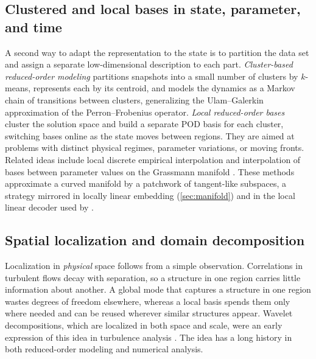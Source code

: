 \subsection{Clustered and local bases in state, parameter, and time}

A second way to adapt the representation to the state is to partition the data
set and assign a separate low-dimensional description to each part.
\emph{Cluster-based reduced-order modeling} \parencite{kaiser2014cluster}
partitions snapshots into a small number of clusters by $k$-means, represents
each by its centroid, and models the dynamics as a Markov chain of transitions
between clusters, generalizing the Ulam--Galerkin approximation of the
Perron--Frobenius operator. \emph{Local reduced-order bases}
\parencite{amsallem2012local} cluster the solution space and build a separate
POD basis for each cluster, switching bases online as the state moves between
regions. They are aimed at problems with distinct physical regimes, parameter
variations, or moving fronts. Related ideas include local discrete empirical
interpolation \parencite{peherstorfer2014ldeim} and interpolation of bases
between parameter values on the Grassmann manifold
\parencite{amsallem2008grassmann}. These methods approximate a curved manifold
by a patchwork of tangent-like subspaces, a strategy mirrored in locally linear
embedding (\cref{sec:manifold}) and in the local linear decoder used by
\textcite{loiseau2018sparse}.

\subsection{Spatial localization and domain decomposition}

Localization in \emph{physical} space follows from a simple observation.
Correlations in turbulent flows decay with separation, so a structure in one
region carries little information about another. A global mode that captures a
structure in one region wastes degrees of freedom elsewhere, whereas a local
basis spends them only where needed and can be reused wherever similar
structures appear. Wavelet decompositions, which are localized in both
space and scale, were an early expression of this idea in turbulence analysis
\parencite{farge1992wavelet}. The idea has a long history in both reduced-order
modeling and numerical analysis.

